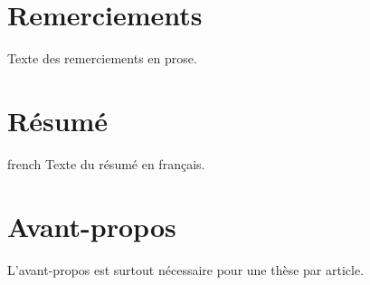 \documentclass[MSc,extensionUQAC,english,french]{ulthese}
\begin{document}
\frontmatter                    %

\pagestitre                     %
\cleardoublepage

\chapter*{Remerciements}         %

Texte des remerciements en prose.


\chapter*{Résumé}                      %

\begin{otherlanguage*}{french}
  Texte du résumé en français.
\end{otherlanguage*}



\cleardoublepage

\chapter*{Avant-propos}         %

L'avant-propos est surtout nécessaire pour une thèse par article.

\cleardoublepage

\tableofcontents                %
\cleardoublepage

\listoftables                   %
\cleardoublepage

\listoffigures                  %
\cleardoublepage

\mainmatter                     %


\appendix                       %


\end{document}
